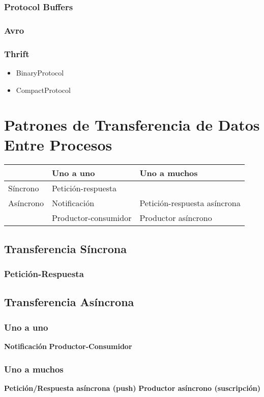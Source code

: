 \subsubsection{Protocol Buffers}
\subsubsection{Avro}
\subsubsection{Thrift}

\begin{itemize}
  \item BinaryProtocol 
  \item CompactProtocol
\end{itemize}

\section{Patrones de Transferencia de Datos Entre Procesos}

\begin{table}[]
  \begin{tabular}{@{}lll@{}}
  \toprule
            & Uno a uno            & Uno a muchos                 \\ \midrule
  Síncrono  & Petición-respuesta   &                              \\ \midrule
  Asíncrono & Notificación         & Petición-respuesta asíncrona \\ 
            & Productor-consumidor & Productor asíncrono          \\ \bottomrule
  \end{tabular}
\end{table}

\subsection{Transferencia Síncrona}

\subsubsection{Petición-Respuesta}

\subsection{Transferencia Asíncrona}

\subsubsection{Uno a uno}
\textbf{Notificación}
\textbf{Productor-Consumidor}

\subsubsection{Uno a muchos}
\textbf{Petición/Respuesta asíncrona (push)}
\textbf{Productor asíncrono (suscripción)}

